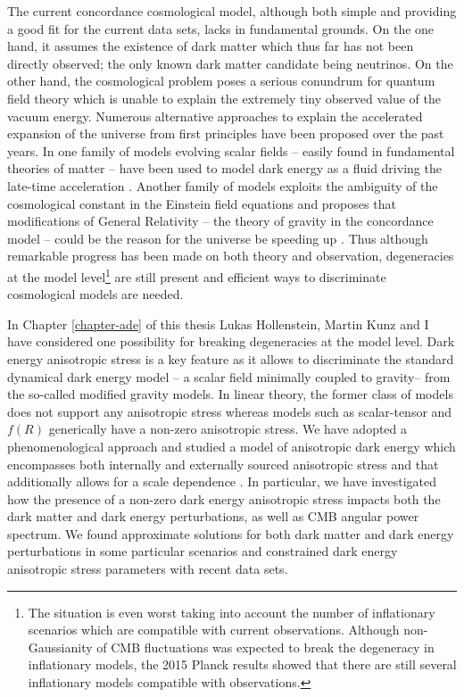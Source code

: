 The current concordance cosmological model, although both simple and providing a good fit for the current data sets, lacks in fundamental grounds. On the one hand, it assumes the existence of dark matter which thus far has not been directly observed; the only known dark matter candidate being neutrinos. On the other hand, the cosmological problem poses a serious conundrum for quantum field theory which is unable to explain the extremely tiny observed value of the vacuum energy. Numerous alternative approaches to explain the accelerated expansion of the universe from first principles have been proposed over the past years. In one family of models evolving scalar fields -- easily found in fundamental theories of matter -- have been used to model dark energy as a fluid driving the late-time acceleration \cite{Copeland:2006wr}. Another family of models exploits the ambiguity of the cosmological constant in the Einstein field equations and proposes that modifications of General Relativity -- the theory of gravity in the concordance model -- could be the reason for the universe be speeding up \cite{Clifton:2011jh}. Thus although remarkable progress has been made on both theory and observation, degeneracies at the model level\footnote{The situation is even worst taking into account the number of inflationary scenarios which are compatible with current observations. Although non-Gaussianity of CMB fluctuations was expected to break the degeneracy in inflationary models, the 2015 Planck results \cite{Ade:2015ava,Ade:2015lrj} showed that there are still several inflationary models compatible with observations.} are still present and efficient ways to discriminate cosmological models are needed.   

In Chapter \ref{chapter-ade} of this thesis Lukas Hollenstein, Martin Kunz and I have considered one possibility for breaking degeneracies at the model level. Dark energy anisotropic stress is a key feature as it allows to discriminate the standard dynamical dark energy model -- a scalar field minimally coupled to gravity-- from the so-called modified gravity models. In linear theory, the former class of models does not support any anisotropic stress whereas models such as scalar-tensor and $f(R)$ generically have a non-zero anisotropic stress. We have adopted a phenomenological approach and studied a model of anisotropic dark energy which encompasses both internally and externally sourced anisotropic stress and that additionally allows for a scale dependence \cite{Cardona:2014iba}. In particular, we have investigated how the presence of a non-zero dark energy anisotropic stress impacts both the dark matter and dark energy perturbations, as well as CMB angular power spectrum. We found approximate solutions for both dark matter and dark energy perturbations in some particular scenarios and constrained dark energy anisotropic stress parameters with recent data sets. 

